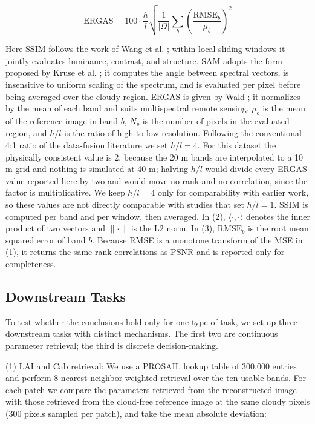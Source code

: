 \documentclass[a4paper,fleqn]{cas-dc}
\begin{document}
\begin{equation}
\mathrm{ERGAS}=100\cdot\frac{h}{l}
\sqrt{\frac{1}{|\Omega|}\sum_{b}
\left(\frac{\mathrm{RMSE}_{b}}{\mu_{b}}\right)^{2}}
\label{eq:ergas}
\end{equation}

Here SSIM follows the work of Wang et al. \cite{ref27}; within local sliding windows it jointly evaluates luminance, contrast, and structure. SAM adopts the form proposed by Kruse et al. \cite{ref9}; it computes the angle between spectral vectors, is insensitive to uniform scaling of the spectrum, and is evaluated per pixel before being averaged over the cloudy region. ERGAS is given by Wald \cite{ref28}; it normalizes by the mean of each band and suits multispectral remote sensing. $\mu_b$ is the mean of the reference image in band $b$, $N_p$ is the number of pixels in the evaluated region, and $h/l$ is the ratio of high to low resolution. Following the conventional 4:1 ratio of the data-fusion literature we set $h/l=4$. For this dataset the physically consistent value is 2, because the 20 m bands are interpolated to a 10 m grid and nothing is simulated at 40 m; halving $h/l$ would divide every ERGAS value reported here by two and would move no rank and no correlation, since the factor is multiplicative. We keep $h/l=4$ only for comparability with earlier work, so these values are not directly comparable with studies that set $h/l=1$. SSIM is computed per band and per window, then averaged. In (2), $\langle\cdot,\cdot\rangle$ denotes the inner product of two vectors and $\|\cdot\|$ is the L2 norm. In (3), $\mathrm{RMSE}_b$ is the root mean squared error of band $b$. Because RMSE is a monotone transform of the MSE in (1), it returns the same rank correlations as PSNR and is reported only for completeness.

\subsection{Downstream Tasks}

To test whether the conclusions hold only for one type of task, we set up three downstream tasks with distinct mechanisms. The first two are continuous parameter retrieval; the third is discrete decision-making.

(1) LAI and Cab retrieval: We use a PROSAIL lookup table \cite{ref29,ref23} of 300,000 entries and perform 8-nearest-neighbor weighted retrieval over the ten usable bands. For each patch we compare the parameters retrieved from the reconstructed image with those retrieved from the cloud-free reference image at the same cloudy pixels (300 pixels sampled per patch), and take the mean absolute deviation:
\end{document}
